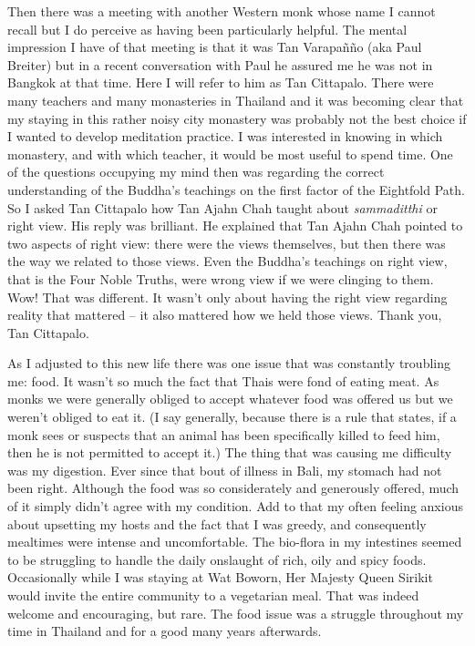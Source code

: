 Then there was a meeting with another Western monk whose name I cannot recall
but I do perceive as having been particularly helpful. The mental impression I
have of that meeting is that it was Tan Varapañño (aka Paul Breiter) but in a
recent conversation with Paul he assured me he was not in Bangkok at that time.
Here I will refer to him as Tan Cittapalo. There were many teachers and many
monasteries in Thailand and it was becoming clear that my staying in this rather
noisy city monastery was probably not the best choice if I wanted to develop
meditation practice. I was interested in knowing in which monastery, and with
which teacher, it would be most useful to spend time. One of the questions
occupying my mind then was regarding the correct understanding of the Buddha’s
teachings on the first factor of the Eightfold Path. So I asked Tan Cittapalo
how Tan Ajahn Chah taught about \emph{sammaditthi} or right view. His reply was
brilliant. He explained that Tan Ajahn Chah pointed to two aspects of right
view: there were the views themselves, but then there was the way we related to
those views. Even the Buddha’s teachings on right view, that is the Four Noble
Truths, were wrong view if we were clinging to them. Wow! That was different.
It wasn’t only about having the right view regarding reality that mattered – it
also mattered how we held those views. Thank you, Tan Cittapalo.

As I adjusted to this new life there was one issue that was constantly
troubling me: food. It wasn't so much the fact that Thais were fond of
eating meat. As monks we were generally obliged to accept whatever food
was offered us but we weren't obliged to eat it. (I say generally,
because there is a rule that states, if a monk sees or suspects that an
animal has been specifically killed to feed him, then he is not
permitted to accept it.) The thing that was causing me difficulty was my
digestion. Ever since that bout of illness in Bali, my stomach had not
been right. Although the food was so considerately and generously
offered, much of it simply didn't agree with my condition. Add to that
my often feeling anxious about upsetting my hosts and the fact that I
was greedy, and consequently mealtimes were intense and uncomfortable.
The bio-flora in my intestines seemed to be struggling to handle the
daily onslaught of rich, oily and spicy foods. Occasionally while I was
staying at Wat Boworn, Her Majesty Queen Sirikit would invite the entire
community to a vegetarian meal. That was indeed welcome and encouraging,
but rare. The food issue was a struggle throughout my time in Thailand
and for a good many years afterwards.

